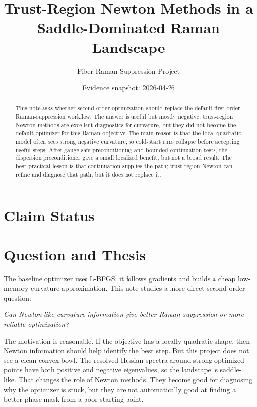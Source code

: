 \documentclass[11pt]{article}
\title{Trust-Region Newton Methods in a Saddle-Dominated Raman Landscape}
\author{Fiber Raman Suppression Project}
\date{Evidence snapshot: 2026-04-26}
\begin{document}
\maketitle

\begin{abstract}
This note asks whether second-order optimization should replace the default
first-order Raman-suppression workflow. The answer is useful but mostly
negative: trust-region Newton methods are excellent diagnostics for curvature,
but they did not become the default optimizer for this Raman objective. The
main reason is that the local quadratic model often sees strong negative
curvature, so cold-start runs collapse before accepting useful steps. After
gauge-safe preconditioning and bounded continuation tests, the dispersion
preconditioner gave a small localized benefit, but not a broad result. The
best practical lesson is that continuation supplies the path; trust-region
Newton can refine and diagnose that path, but it does not replace it.
\end{abstract}

\section*{Claim Status}

\section{Question and Thesis}

The baseline optimizer uses L-BFGS: it follows gradients and builds a cheap
low-memory curvature approximation. This note studies a more direct
second-order question:
\begin{center}
\emph{Can Newton-like curvature information give better Raman suppression or
more reliable optimization?}
\end{center}

The motivation is reasonable. If the objective has a locally quadratic shape,
then Newton information should help identify the best step. But this project
does not see a clean convex bowl. The resolved Hessian spectra around strong
optimized points have both positive and negative eigenvalues, so the landscape
is saddle-like. That changes the role of Newton methods. They become good
for diagnosing why the optimizer is stuck, but they are not automatically good
at finding a better phase mask from a poor starting point.
\end{document}
